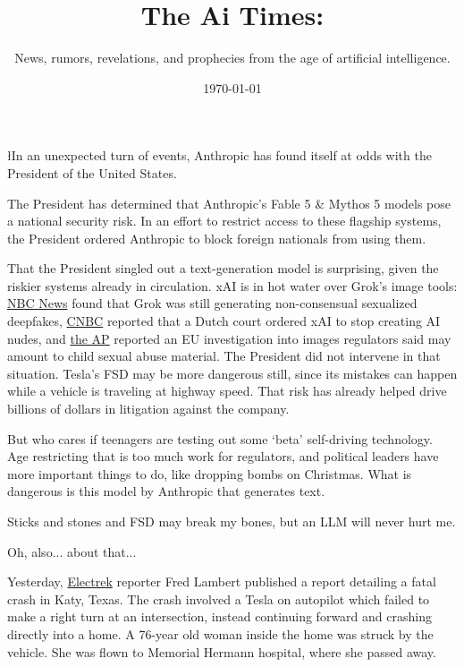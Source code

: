 \documentclass{news}
\title    {The Ai Times:}
\subtitle {News, rumors, revelations, and prophecies from the age of artificial intelligence.}
\date     {\today}
\begin{document}


{\l{I}n an unexpected turn of events, Anthropic has found itself at odds with the President of the United States.
\par} 
The President has determined that Anthropic's Fable 5 \& Mythos 5 models pose a national security risk. In an effort to restrict access to these flagship systems, the President ordered Anthropic to block foreign nationals from using them.

That the President singled out a text-generation model is surprising, given the riskier systems already in circulation. xAI is in hot water over Grok's image tools: \href{https://www.nbcnews.com/tech/tech-news/musks-ai-chatbot-grok-xai-making-sexual-deepfakes-imagine-rcna265855}{NBC News} found that Grok was still generating non-consensual sexualized deepfakes, \href{https://www.cnbc.com/2026/03/27/grok-elon-musk-dutch-court-ban-ai-nudes.html}{CNBC} reported that a Dutch court ordered xAI to stop creating AI nudes, and \href{https://apnews.com/article/c1a3039e5aaeb4dd517d995b8b301537}{the AP} reported an EU investigation into images regulators said may amount to child sexual abuse material. The President did not intervene in that situation. Tesla's FSD may be more dangerous still, since its mistakes can happen while a vehicle is traveling at highway speed. That risk has already helped drive billions of dollars in litigation against the company.

But who cares if teenagers are testing out some `beta' self-driving technology. Age restricting that is too much work for regulators, and political leaders have more important things to do, like dropping bombs on Christmas. What is dangerous is this model by Anthropic that generates text. 

Sticks and stones and FSD may break my bones, but an LLM will never hurt me.

Oh, also... about that...

Yesterday, \href{https://electrek.co/2026/06/20/tesla-autopilot-katy-texas-home-crash-woman-killed/}{Electrek} reporter Fred Lambert published a report detailing a fatal crash in Katy, Texas. The crash involved a Tesla on autopilot which failed to make a right turn at an intersection, instead continuing forward and crashing directly into a home. A 76-year old woman inside the home was struck by the vehicle. She was flown to Memorial Hermann hospital, where she passed away.
\end{document}
